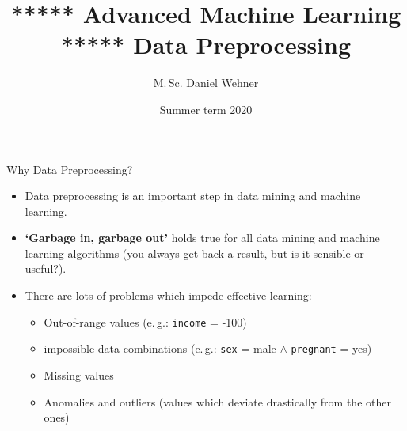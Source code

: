 




\title[Data Preprocessing]{***** Advanced Machine Learning ***** Data Preprocessing}
\author{M.\,Sc. Daniel Wehner}
\date{Summer term 2020}




\dwPrintTitle

\dwPrintToc


\begin{dwHeaderFrame}{Why Data Preprocessing?}
	\begin{itemize}
		\item Data preprocessing is an important step in data mining and machine learning.
		\item \textbf{`Garbage in, garbage out'} holds true for all data mining and machine learning algorithms (you always get back a result, but is it sensible or useful?).
		\item There are lots of problems which impede effective learning:
		\begin{itemize}
			\item Out-of-range values (e.\,g.: \texttt{income} = -100)
			\item impossible data combinations (e.\,g.: \texttt{sex} = male $\wedge$ \texttt{pregnant} = yes)
			\item Missing values
			\item Anomalies and outliers (values which deviate drastically from the other ones)
		\end{itemize}
	\end{itemize}
\end{dwHeaderFrame}


